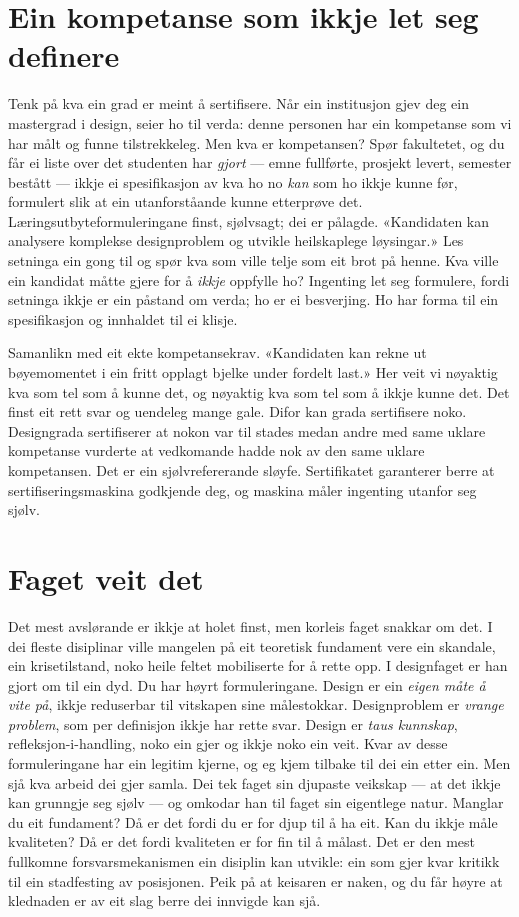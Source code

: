 \section{Ein kompetanse som ikkje let seg definere}

Tenk på kva ein grad er meint å sertifisere. Når ein institusjon gjev deg ein mastergrad i design, seier ho til verda: denne personen har ein kompetanse som vi har målt og funne tilstrekkeleg. Men kva er kompetansen? Spør fakultetet, og du får ei liste over det studenten har \emph{gjort} — emne fullførte, prosjekt levert, semester bestått — ikkje ei spesifikasjon av kva ho no \emph{kan} som ho ikkje kunne før, formulert slik at ein utanforståande kunne etterprøve det. Læringsutbyteformuleringane finst, sjølvsagt; dei er pålagde. «Kandidaten kan analysere komplekse designproblem og utvikle heilskaplege løysingar.» Les setninga ein gong til og spør kva som ville telje som eit brot på henne. Kva ville ein kandidat måtte gjere for å \emph{ikkje} oppfylle ho? Ingenting let seg formulere, fordi setninga ikkje er ein påstand om verda; ho er ei besverjing. Ho har forma til ein spesifikasjon og innhaldet til ei klisje.

Samanlikn med eit ekte kompetansekrav. «Kandidaten kan rekne ut bøyemomentet i ein fritt opplagt bjelke under fordelt last.» Her veit vi nøyaktig kva som tel som å kunne det, og nøyaktig kva som tel som å ikkje kunne det. Det finst eit rett svar og uendeleg mange gale. Difor kan grada sertifisere noko. Designgrada sertifiserer at nokon var til stades medan andre med same uklare kompetanse vurderte at vedkomande hadde nok av den same uklare kompetansen. Det er ein sjølvrefererande sløyfe. Sertifikatet garanterer berre at sertifiseringsmaskina godkjende deg, og maskina måler ingenting utanfor seg sjølv.

\section{Faget veit det}

Det mest avslørande er ikkje at holet finst, men korleis faget snakkar om det. I dei fleste disiplinar ville mangelen på eit teoretisk fundament vere ein skandale, ein krisetilstand, noko heile feltet mobiliserte for å rette opp. I designfaget er han gjort om til ein dyd. Du har høyrt formuleringane. Design er ein \emph{eigen måte å vite på}, ikkje reduserbar til vitskapen sine målestokkar. Designproblem er \emph{vrange problem}, som per definisjon ikkje har rette svar. Design er \emph{taus kunnskap}, refleksjon-i-handling, noko ein gjer og ikkje noko ein veit. Kvar av desse formuleringane har ein legitim kjerne, og eg kjem tilbake til dei ein etter ein. Men sjå kva arbeid dei gjer samla. Dei tek faget sin djupaste veikskap — at det ikkje kan grunngje seg sjølv — og omkodar han til faget sin eigentlege natur. Manglar du eit fundament? Då er det fordi du er for djup til å ha eit. Kan du ikkje måle kvaliteten? Då er det fordi kvaliteten er for fin til å målast. Det er den mest fullkomne forsvarsmekanismen ein disiplin kan utvikle: ein som gjer kvar kritikk til ein stadfesting av posisjonen. Peik på at keisaren er naken, og du får høyre at klednaden er av eit slag berre dei innvigde kan sjå.

